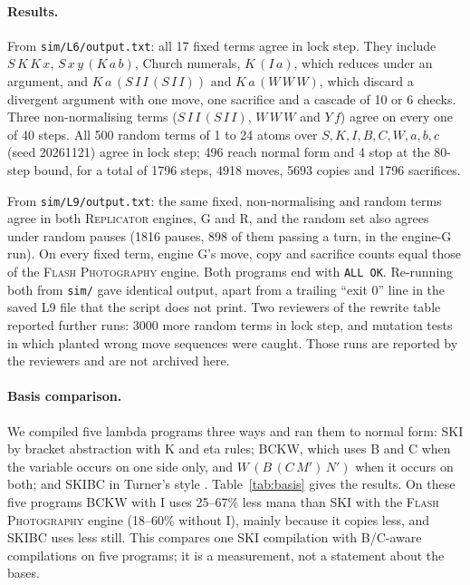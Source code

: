 \documentclass[11pt]{article}
\theoremstyle{definition}
\newcommand{\card}[1]{{\mdseries\scshape #1}}
\begin{document}
\paragraph{Results.} From \texttt{sim/L6/output.txt}: all 17 fixed terms agree in lock
step. They include $S\,K\,K\,x$, $S\,x\,y\,(K\,a\,b)$, Church numerals, $K\,(I\,a)$, which
reduces under an argument, and $K\,a\,(S\,I\,I\,(S\,I\,I))$ and $K\,a\,(W\,W\,W)$, which
discard a divergent argument with one move, one sacrifice and a cascade of 10 or 6
checks. Three non-normalising terms ($S\,I\,I\,(S\,I\,I)$, $W\,W\,W$ and $Y\,f$) agree on
every one of 40 steps. All 500 random terms of 1 to 24 atoms over $S,K,I,B,C,W,a,b,c$
(seed 20261121) agree in lock step; 496 reach normal form and 4 stop at the 80-step
bound, for a total of 1796 steps, 4918 moves, 5693 copies and 1796 sacrifices.

From \texttt{sim/L9/output.txt}: the same fixed, non-normalising and random terms agree in
both \card{Replicator} engines, G and R, and the random set also agrees under random pauses
(1816 pauses, 898 of them passing a turn, in the engine-G run). On every fixed term,
engine G's move, copy and sacrifice counts equal those of the \card{Flash Photography}
engine. Both programs end with \texttt{ALL OK}. Re-running both from \texttt{sim/} gave
identical output, apart from a trailing ``exit 0'' line in the saved L9 file that the
script does not print. Two reviewers of the rewrite table reported further runs: 3000
more random terms in lock step, and mutation tests in which planted wrong move sequences
were caught. Those runs are reported by the reviewers and are not archived here.

\paragraph{Basis comparison.} We compiled five lambda programs three ways and ran them to
normal form: SKI by bracket abstraction with K and eta rules; BCKW, which uses B and C when
the variable occurs on one side only, and $W\,(B\,(C\,M')\,N')$ when it occurs on both;
and SKIBC in Turner's style \citep{turner1979}. Table~\ref{tab:basis} gives the results.
On these five programs BCKW with I uses 25--67\% less mana than SKI with the \card{Flash
Photography} engine (18--60\% without I), mainly because it copies less, and SKIBC uses
less still. This compares one SKI compilation with B/C-aware compilations on five
programs; it is a measurement, not a statement about the bases.
\end{document}
